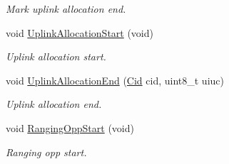 \begin{DoxyCompactItemize}
\begin{DoxyCompactList}\small\item\em Mark uplink allocation end. \end{DoxyCompactList}\item 
void \hyperlink{classns3_1_1BaseStationNetDevice_ae00cd52b976f0d636afb5e9dfd999379}{Uplink\+Allocation\+Start} (void)
\begin{DoxyCompactList}\small\item\em Uplink allocation start. \end{DoxyCompactList}\item 
void \hyperlink{classns3_1_1BaseStationNetDevice_aaa838b517c40f39c39e25585f0a8ad1e}{Uplink\+Allocation\+End} (\hyperlink{classns3_1_1Cid}{Cid} cid, uint8\+\_\+t uiuc)
\begin{DoxyCompactList}\small\item\em Uplink allocation end. \end{DoxyCompactList}\item 
void \hyperlink{classns3_1_1BaseStationNetDevice_a51b61101df4934e02ee2835f079b402e}{Ranging\+Opp\+Start} (void)
\begin{DoxyCompactList}\small\item\em Ranging opp start. \end{DoxyCompactList}\end{DoxyCompactItemize}

